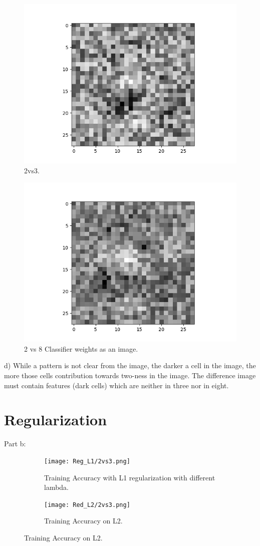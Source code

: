 \documentclass{article} %
\begin{document}
\begin{figure}[H]
\begin{center}
\includegraphics[width=0.8\linewidth]{2vs3.png}
\end{center}
\caption{2vs3.}
\end{figure}

\begin{figure}[H]
\begin{center}
\includegraphics[width=0.8\linewidth]{2vs8.png}
\end{center}
\caption{2 vs 8 Classifier weights as an image.}
\end{figure}
d) While a pattern is not clear from the image, the darker a cell in the image, the more those cells contribution towards two-ness in the image. The difference image must contain features (dark cells) which are neither in three nor in eight.

\section{Regularization}
Part b:
\begin{figure}[H]
\centering
\begin{subfigure}{.5\textwidth}
	\centering
	\texttt{[image: Reg\_L1/2vs3.png]}
	\caption{Training Accuracy with L1 regularization with different lambda.}
\end{subfigure}%
\begin{subfigure}{.5\textwidth}
    \centering
	\texttt{[image: Red\_L2/2vs3.png]}
	\caption{Training Accuracy on L2.}
\end{subfigure}
\end{figure}
\end{document}
